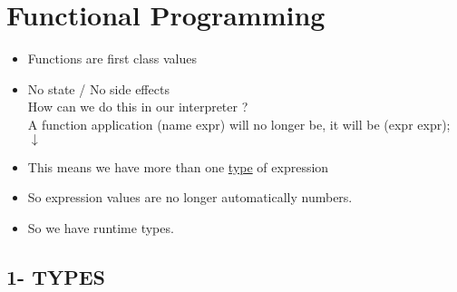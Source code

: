\documentclass{article}
\begin{document}
\section{Functional Programming}
\begin{flushleft}
\begin{itemize}
\item Functions are first class values
\item No state / No side effects\\
\doublespacing
How can we do this in our interpreter ?\\
A function application (name expr) will no longer be, it will be (expr expr);\\
$\downarrow$
\item This means we have more than one \underline{type} of expression
\item So expression values are no longer automatically numbers.
\item So we have runtime types.
\end{itemize}
\end{flushleft}

\subsection*{1- TYPES}
\end{document}
